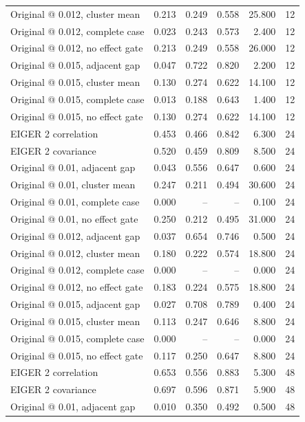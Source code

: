 \begin{table}[htbp]
{\begin{tabular}{lrrrrr}
Original @ 0.012, cluster mean & 0.213 & 0.249 & 0.558 & 25.800 & 12 \\
Original @ 0.012, complete case & 0.023 & 0.243 & 0.573 & 2.400 & 12 \\
Original @ 0.012, no effect gate & 0.213 & 0.249 & 0.558 & 26.000 & 12 \\
Original @ 0.015, adjacent gap & 0.047 & 0.722 & 0.820 & 2.200 & 12 \\
Original @ 0.015, cluster mean & 0.130 & 0.274 & 0.622 & 14.100 & 12 \\
Original @ 0.015, complete case & 0.013 & 0.188 & 0.643 & 1.400 & 12 \\
Original @ 0.015, no effect gate & 0.130 & 0.274 & 0.622 & 14.100 & 12 \\
EIGER 2 correlation & 0.453 & 0.466 & 0.842 & 6.300 & 24 \\
EIGER 2 covariance & 0.520 & 0.459 & 0.809 & 8.500 & 24 \\
Original @ 0.01, adjacent gap & 0.043 & 0.556 & 0.647 & 0.600 & 24 \\
Original @ 0.01, cluster mean & 0.247 & 0.211 & 0.494 & 30.600 & 24 \\
Original @ 0.01, complete case & 0.000 & -- & -- & 0.100 & 24 \\
Original @ 0.01, no effect gate & 0.250 & 0.212 & 0.495 & 31.000 & 24 \\
Original @ 0.012, adjacent gap & 0.037 & 0.654 & 0.746 & 0.500 & 24 \\
Original @ 0.012, cluster mean & 0.180 & 0.222 & 0.574 & 18.800 & 24 \\
Original @ 0.012, complete case & 0.000 & -- & -- & 0.000 & 24 \\
Original @ 0.012, no effect gate & 0.183 & 0.224 & 0.575 & 18.800 & 24 \\
Original @ 0.015, adjacent gap & 0.027 & 0.708 & 0.789 & 0.400 & 24 \\
Original @ 0.015, cluster mean & 0.113 & 0.247 & 0.646 & 8.800 & 24 \\
Original @ 0.015, complete case & 0.000 & -- & -- & 0.000 & 24 \\
Original @ 0.015, no effect gate & 0.117 & 0.250 & 0.647 & 8.800 & 24 \\
EIGER 2 correlation & 0.653 & 0.556 & 0.883 & 5.300 & 48 \\
EIGER 2 covariance & 0.697 & 0.596 & 0.871 & 5.900 & 48 \\
Original @ 0.01, adjacent gap & 0.010 & 0.350 & 0.492 & 0.500 & 48 \\

\end{tabular}}
\end{table}
